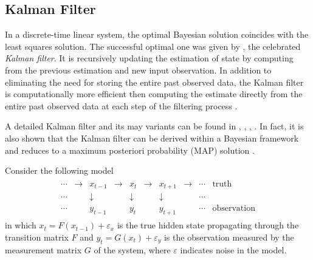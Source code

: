 \subsection*{Kalman Filter}

In a discrete-time linear system, the optimal Bayesian solution coincides with the least squares solution. The successful optimal one was given by \cite{kalman1960new},  the celebrated \textit{Kalman filter}. It is recursively updating the estimation of state by computing from the previous estimation and new input observation. In addition to eliminating the need for storing the entire past observed data, the Kalman filter is computationally more efficient then computing the estimate directly from the entire past observed data at each step of the filtering process \cite{haykin2001kalman}. 

A detailed Kalman filter and its may variants can be found in \cite{chen2003bayesian}, \cite{rhodes1971tutorial}, \cite{kailath1981lectures}, \cite{sorenson1985kalman}. In fact, it is also shown that the Kalman filter can be derived within a Bayesian framework and reduces to a maximum posteriori probability (MAP) solution \cite{haykin2001kalman}. 

Consider the following model 
\begin{align}\label{introKFmodel}
\begin{array}{cccccccccc}\cdots &\to &x_{t-1}&\to &x_{t}&\to &x_{t+1}&\to &\cdots &{\text{truth}}\\ \cdots &&\downarrow &&\downarrow &&\downarrow &&\cdots &\\ \cdots&&y_{t-1}&&y_{t}&&y_{t+1}&&\cdots &{\text{observation}}\end{array}
 \end{align}
in which $x_t=F(x_{t-1})+\varepsilon_x$ is the true hidden state propagating through the transition matrix $F$ and $y_t=G(x_t)+\varepsilon_y$ is the observation measured by the measurement matrix $G$ of the system, where $\varepsilon$ indicates \iid noise in the model. 




